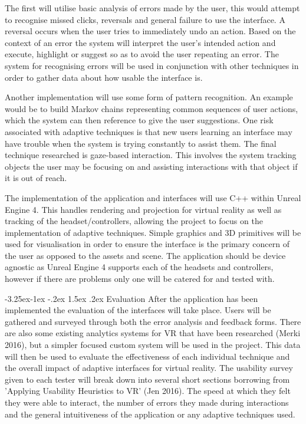 \documentclass[11pt]{article}
\makeatletter
\renewcommand{\subsection}{\@startsection{subsection}{2}{\z@}%
             {-3.25ex\@plus -1ex \@minus -.2ex}%
             {1.5ex \@plus .2ex}%
             {\normalfont\large\scshape\bfseries}}
\makeatother
\begin{document}
The first will utilise basic analysis of errors made by the user, this would attempt to recognise missed clicks, reversals and general failure to use the interface. A reversal occurs when the user tries to immediately undo an action. Based on the context of an error the system will interpret the user's intended action and execute, highlight or suggest so as to avoid the user repeating an error. The system for recognising errors will be used in conjunction with other techniques in order to gather data about how usable the interface is.

Another implementation will use some form of pattern recognition. An example would be to build Markov chains representing common sequences of user actions, which the system can then reference to give the user suggestions. One risk associated with adaptive techniques is that new users learning an interface may have trouble when the system is trying constantly to assist them. The final technique researched is gaze-based interaction. This involves the system tracking objects the user may be focusing on and assisting interactions with that object if it is out of reach.

The implementation of the application and interfaces will use C++ within Unreal Engine 4. This handles rendering and projection for virtual reality as well as tracking of the headset/controllers, allowing the project to focus on the implementation of adaptive techniques. Simple graphics and 3D primitives will be used for visualisation in order to ensure the interface is the primary concern of the user as opposed to the assets and scene. The application should be device agnostic as Unreal Engine 4 supports each of the headsets and controllers, however if there are problems only one will be catered for and tested with. 

\subsection{Evaluation}
After the application has been implemented the evaluation of the interfaces will take place. Users will be gathered and surveyed through both the error analysis and feedback forms. There are also some existing analytics systems for VR that have been researched (Merki 2016), but a simpler focused custom system will be used in the project. This data will then be used to evaluate the effectiveness of each individual technique and the overall impact of adaptive interfaces for virtual reality. The usability survey given to each tester will break down into several short sections borrowing from 'Applying Usability Heuristics to VR' (Jen 2016). The speed at which they felt they were able to interact, the number of errors they made during interactions and the general intuitiveness of the application or any adaptive techniques used.
\end{document}
